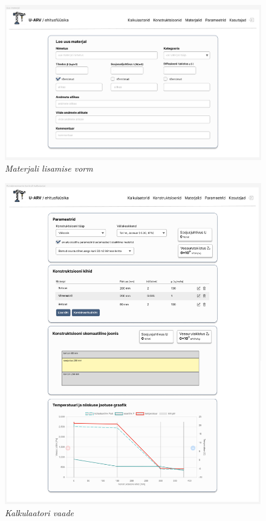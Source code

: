 \begin{figure}[ht]
    \centering
    \includegraphics[width=.9\textwidth]{figures/interface_desing/ap_desing_addmaterial.png}
    \caption[Kasutajaliidese disaain: materjali lisamise vorm]{\textit{Materjali lisamise vorm}}
    \label{fig:interface_design_addmaterial}
\end{figure}
\begin{figure}[ht]
    \centering
    \includegraphics[width=.9\textwidth]{figures/interface_desing/ap_desing_calculator.png}
    \caption[Kasutajaliidese disaain: kalkulaatori vaade]{\textit{Kalkulaatori vaade}}
    \label{fig:interface_design_calculator}
\end{figure}






